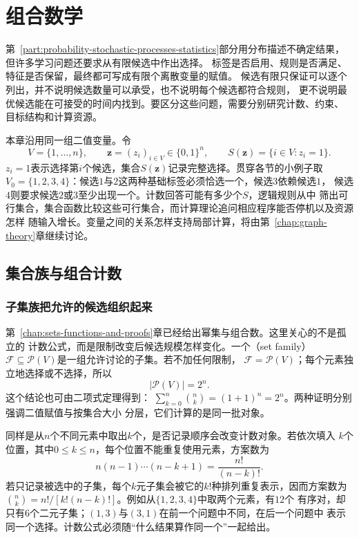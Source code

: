 \chapter{组合数学}
\label{chap:combinatorics}

第~\ref{part:probability-stochastic-processes-statistics}部分用分布描述不确定结果，
但许多学习问题还要求从有限候选中作出选择。
标签是否启用、规则是否满足、特征是否保留，最终都可写成有限个离散变量的赋值。
候选有限只保证可以逐个列出，并不说明候选数量可以承受，也不说明每个候选都符合规则，
更不说明最优候选能在可接受的时间内找到。要区分这些问题，需要分别研究计数、约束、
目标结构和计算资源。

本章沿用同一组二值变量。令
\[
  V=\{1,\ldots,n\},\qquad
  \bm{z}=(z_i)_{i\in V}\in\{0,1\}^n,
  \qquad
  S(\bm{z})=\{i\in V:z_i=1\}.
\]
$z_i=1$表示选择第$i$个候选，集合$S(\bm{z})$记录完整选择。贯穿各节的小例子取
$V_0=\{1,2,3,4\}$：候选$1$与$2$这两种基础标签必须恰选一个，候选$3$依赖候选$1$，
候选$4$则要求候选$2$或$3$至少出现一个。计数回答可能有多少个$S$，逻辑规则从中
筛出可行集合，集合函数比较这些可行集合，而计算理论追问相应程序能否停机以及资源怎样
随输入增长。变量之间的关系怎样支持局部计算，将由第~\ref{chap:graph-theory}章继续讨论。

\section{集合族与组合计数}
\label{sec:comb-families-counting}

\subsection{子集族把允许的候选组织起来}

第~\ref{chap:sets-functions-and-proofs}章已经给出幂集与组合数。这里关心的不是孤立的
计数公式，而是限制改变后候选规模怎样变化。一个（set family）
$\mathcal{F}\subseteq\mathcal{P}(V)$是一组允许讨论的子集。若不加任何限制，
$\mathcal{F}=\mathcal{P}(V)$；每个元素独立地选择或不选择，所以
\begin{equation}
  |\mathcal{P}(V)|=2^n.
  \label{eq:comb-power-set-count}
\end{equation}
这个结论也可由二项式定理得到：
$\sum_{k=0}^{n}\binom{n}{k}=(1+1)^n=2^n$。两种证明分别强调二值赋值与按集合大小
分层，它们计算的是同一批对象。

同样是从$n$个不同元素中取出$k$个，是否记录顺序会改变计数对象。若依次填入
$k$个位置，其中$0\leq k\leq n$，每个位置不能重复使用元素，方案数为
\[
  n(n-1)\cdots(n-k+1)=\frac{n!}{(n-k)!}.
\]
若只记录被选中的子集，每个$k$元子集会被它的$k!$种排列重复表示，因而方案数为
$\binom{n}{k}=n!/[k!(n-k)!]$。例如从$\{1,2,3,4\}$中取两个元素，有$12$个
有序对，却只有$6$个二元子集；$(1,3)$与$(3,1)$在前一个问题中不同，在后一个问题中
表示同一个选择。计数公式必须随“什么结果算作同一个”一起给出。

